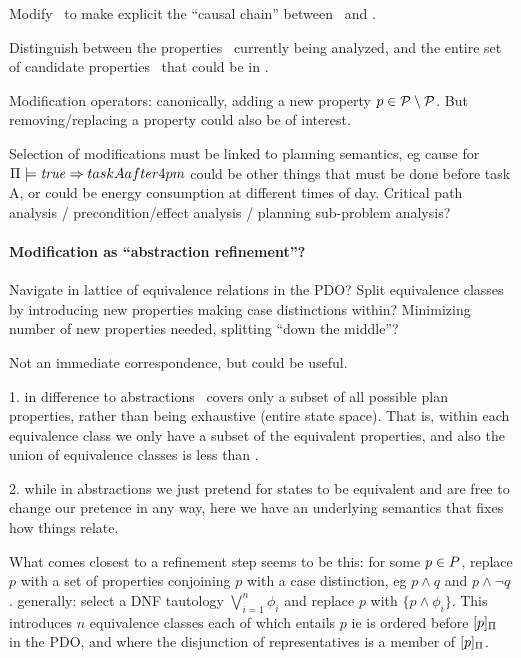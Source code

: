 Modify \props\ to make explicit the ``causal chain'' between
\prop\ and \propq. 

Distinguish between the properties \props\ currently being analyzed,
and the entire set of candidate properties \candprops\ that could be
in \props.

Modification operators: canonically, adding a new property $p \in
\cal P \setminus P$. But removing/replacing a property could
also be of interest.

Selection of modifications must be linked to planning semantics, eg
cause for $\Pi \models \mathit{true} \Rightarrow taskAafter4pm$ could be other
things that must be done before task A, or could be energy consumption
at different times of day. Critical path analysis /
precondition/effect analysis / planning sub-problem analysis?



\paragraph{Modification as ``abstraction refinement''?}

Navigate in lattice of equivalence relations in the PDO? Split
equivalence classes by introducing new properties making case
distinctions within? Minimizing number of new properties needed,
splitting ``down the middle''? 

Not an immediate correspondence, but could be useful.

1. in difference to abstractions \props\ covers only a subset of all
possible plan properties, rather than being exhaustive (entire state
space). That is, within each equivalence class we only have a subset
of the equivalent properties, and also the union of equivalence
classes is less than \candprops.

2. while in abstractions we just pretend for states to be equivalent
and are free to change our pretence in any way, here we have an
underlying semantics that fixes how things relate.

What comes closest to a refinement step seems to be this: for some $p
\in P$, replace $p$ with a set of properties conjoining $p$ with
a case distinction, eg $p \wedge q$ and $p \wedge \neg q$. generally:
select a DNF tautology $\bigvee_{i=1}^n \phi_i$ and replace $p$ with
$\{p \wedge \phi_i\}$. This introduces $n$ equivalence classes each of
which entails $p$ ie is ordered before $[p]_{\Pi}$ in the
PDO, and where the disjunction of representatives is a member of
$[p]_{\Pi}$.

